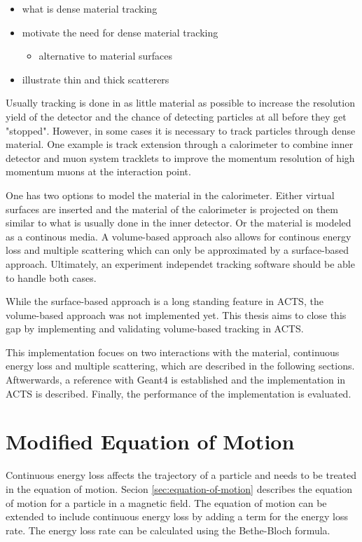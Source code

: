 \begin{itemize}
    \color{red}
    \item what is dense material tracking
    \item motivate the need for dense material tracking
    \begin{itemize}
        \item alternative to material surfaces
    \end{itemize}
    \item illustrate thin and thick scatterers
\end{itemize}

Usually tracking is done in as little material as possible to increase the resolution yield of the detector and the chance of detecting particles at all before they get "stopped". However, in some cases it is necessary to track particles through dense material. One example is track extension through a calorimeter to combine inner detector and muon system tracklets to improve the momentum resolution of high momentum muons at the interaction point.

One has two options to model the material in the calorimeter. Either virtual surfaces are inserted and the material of the calorimeter is projected on them similar to what is usually done in the inner detector. Or the material is modeled as a continous media. A volume-based approach also allows for continous energy loss and multiple scattering which can only be approximated by a surface-based approach. Ultimately, an experiment independet tracking software should be able to handle both cases.

While the surface-based approach is a long standing feature in ACTS, the volume-based approach was not implemented yet. This thesis aims to close this gap by implementing and validating volume-based tracking in ACTS.

This implementation focues on two interactions with the material, continuous energy loss and multiple scattering, which are described in the following sections. Aftwerwards, a reference with Geant4 is established and the implementation in ACTS is described. Finally, the performance of the implementation is evaluated.

\section{Modified Equation of Motion}

Continuous energy loss affects the trajectory of a particle and needs to be treated in the equation of motion. Secion \ref{sec:equation-of-motion} describes the equation of motion for a particle in a magnetic field. The equation of motion can be extended to include continuous energy loss by adding a term for the energy loss rate. The energy loss rate can be calculated using the Bethe-Bloch formula.

